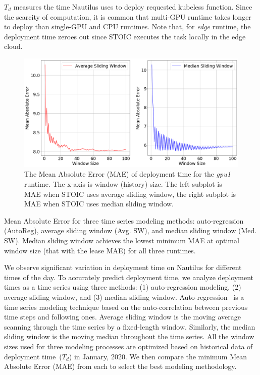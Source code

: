 $T_d$ measures the time
Nautilus uses to deploy requested kubeless function. Since the scarcity of
computation, it is common that multi-GPU runtime takes longer to deploy than
single-GPU and CPU runtimes. Note that, for \textit{edge} runtime, the
deployment time zeroes out since STOIC executes the task locally in the edge
cloud.
 
\begin{figure}
    \centering
    \includegraphics[scale=0.18]{figures/deployment}
    \caption{The Mean Absolute Error (MAE) of deployment time for the \textit{gpu1} runtime. The x-axis is window (history) size. The left subplot is MAE when STOIC uses average sliding window, the right subplot is MAE when STOIC uses median sliding window.
\label{fig:deployment}}
\end{figure}

 
\begin{table}
\centering

\caption{Mean Absolute Error for three time series modeling methods: auto-regression (AutoReg), average sliding window (Avg. SW), and median sliding window (Med. SW). Median sliding window achieves the lowest minimum MAE at optimal window size (that with the lease MAE) for all three runtimes. \label{tab:deployment}}
\end{table}
 

We observe significant variation in deployment time on Nautilus for different
times of the day. To accurately predict deployment time, we analyze deployment
times as a time series using three methods: (1) auto-regression modeling, (2)
average sliding window, and (3) median sliding window.
Auto-regression~\cite{ref:autoreg} is a time series modeling technique based
on the auto-correlation between previous time steps and following ones.
Average sliding window is the moving average~\cite{ref:moveavg} scanning
through the time series by a fixed-length window. Similarly, the median
sliding window is the moving median throughout the time series. All the window
sizes used for three modeling processes are optimized based on historical data
of deployment time~($T_d$) in January, 2020. We then compare the minimum Mean
Absolute Error (MAE) from each to select the best modeling methodology. 

